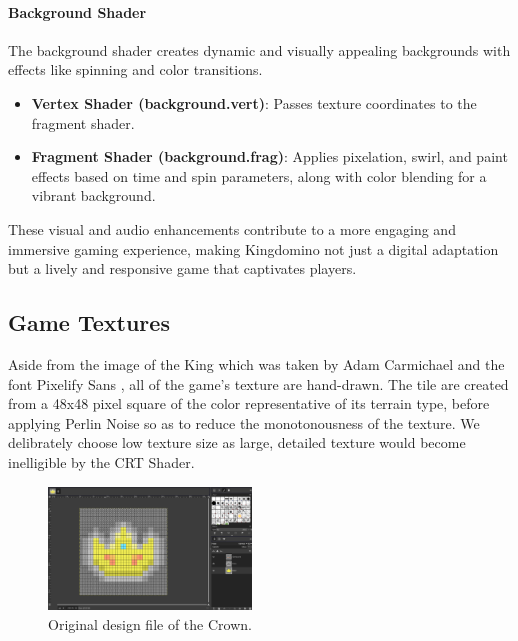 \documentclass[conference]{IEEEtran}
\begin{document}
\paragraph{Background Shader}
The background shader creates dynamic and visually appealing backgrounds with
effects like spinning and color transitions.

\begin{itemize}
    \item \textbf{Vertex Shader (background.vert)}: Passes texture coordinates to the fragment shader.
    \item \textbf{Fragment Shader (background.frag)}: Applies pixelation, swirl, and paint effects based on time and spin parameters, along with color blending for a vibrant background.
\end{itemize}

These visual and audio enhancements contribute to a more engaging and immersive
gaming experience, making Kingdomino not just a digital adaptation but a lively
and responsive game that captivates players.

\subsection{Game Textures}

Aside from the image of the King which was taken by Adam Carmichael
\cite{github:carmichael-repo} and the font Pixelify Sans
\cite{github:pixelify-sans}, all of the game's texture are hand-drawn. The tile
are created from a 48x48 pixel square of the color representative of its
terrain type, before applying Perlin Noise \cite{wiki:perlin-noise} so as to
reduce the monotonousness of the texture. We delibrately choose low texture
size as large, detailed texture would become inelligible by the CRT Shader.

\begin{figure}[htbp]
    \centerline{\includegraphics[width=0.48\textwidth]{assets/crown-design-file.png}}
    \caption{Original design file of the Crown.}\label{fig:crown-design}
\end{figure}
\end{document}
